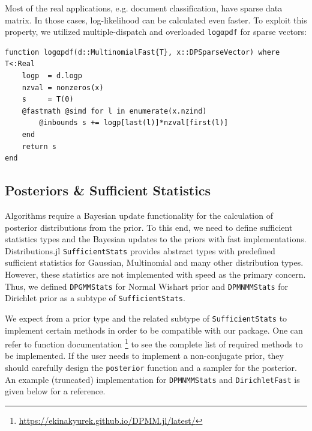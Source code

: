\documentclass[12pt, a4paper]{article}
\newenvironment{code}{\captionsetup{type=listing}}{}
\begin{document}
Most of the real applications, e.g. document classification, have sparse data matrix. In those cases, log-likelihood can be calculated even faster. To exploit this property, we utilized multiple-dispatch and overloaded \texttt{logαpdf} for sparse vectors:

\begin{code}
\label{code:multinomialfastlikelihood}
\begin{verbatim}
function logαpdf(d::MultinomialFast{T}, x::DPSparseVector) where T<:Real
    logp  = d.logp
    nzval = nonzeros(x)
    s     = T(0)
    @fastmath @simd for l in enumerate(x.nzind)
        @inbounds s += logp[last(l)]*nzval[first(l)]
    end
    return s
end
\end{verbatim}
\end{code}


\subsection{Posteriors \& Sufficient Statistics}
Algorithms require a Bayesian update functionality for the calculation of posterior distributions from the prior. To this end, we need to define sufficient statistics types and the Bayesian updates to the priors with fast implementations. Distributions.jl \texttt{SufficientStats} provides abstract types with predefined sufficient statistics for Gaussian, Multinomial and many other distribution types. However, these statistics are not implemented with speed as the primary concern. Thus, we defined \texttt{DPGMMStats} for Normal Wishart prior and \texttt{DPMNMMStats} for Dirichlet prior as a subtype of \texttt{SufficientStats}. 

We expect from a prior type and the related subtype of \texttt{SufficientStats} to implement certain methods in order to be compatible with our package. One can refer to function documentation \footnote{\url{https://ekinakyurek.github.io/DPMM.jl/latest/}}  to see the complete list of required methods to be implemented. If the user needs to implement a non-conjugate prior, they should carefully design the \texttt{posterior} function and a sampler for the posterior. An example (truncated) implementation for \texttt{DPMNMMStats} and \texttt{DirichletFast} is given below for a reference. 
\end{document}
